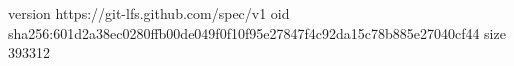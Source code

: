 version https://git-lfs.github.com/spec/v1
oid sha256:601d2a38ec0280ffb00de049f0f10f95e27847f4c92da15c78b885e27040cf44
size 393312
